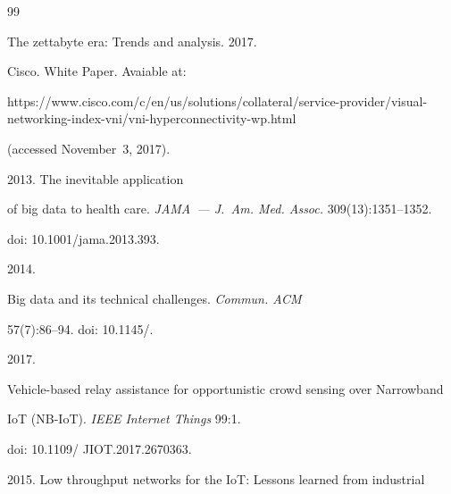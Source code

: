 {\small\frenchspacing


{%




\begin{thebibliography}{99}




 The zettabyte era: Trends and analysis.  2017.


Cisco. White Paper. Avaiable at: 


{\sf https://www.cisco.com/c/en/us/solutions/collateral/service-provider/visual- networking-index-vni/vni-hyperconnectivity-wp.html} 


(accessed November~3, 2017).







 2013. The inevitable application 


of big data to health care. \textit{JAMA~--- J.~Am. Med. Assoc.} 309(13):1351--1352. 


doi: 10.1001\!/\!jama.2013.393.







 2014. 


Big data and its technical challenges. \textit{Commun.  ACM}


57(7):86--94. doi: 10.1145\!/.







 2017.


Vehicle-based relay assistance for opportunistic crowd sensing over Narrowband 


IoT (NB-IoT). \textit{IEEE Internet Things} 99:1. 


doi: 10.1109\!/ JIOT.2017.2670363.






2015. Low throughput networks for the IoT: Lessons learned from industrial 



\end{thebibliography}}}
